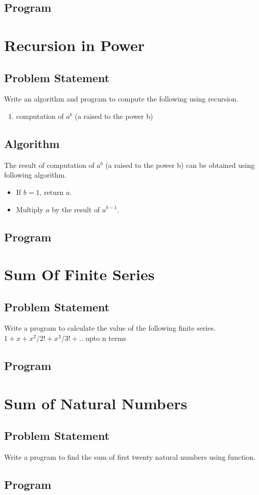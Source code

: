 \documentclass[11pt]{report}
\begin{document}
\section{Program}
        

\chapter{Recursion in Power}
\section{Problem Statement}
Write an algorithm and program to compute the following using recursion.
\begin{enumerate}
  \item computation of $a^b$ (a raised to the power b)
\end{enumerate}
\section{Algorithm}
The result of computation of $a^b$ (a raised to the power b) can be obtained using following algorithm.
\begin{itemize}
\item If $b = 1$, return $a$.
\item Multiply $a$ by the result of $a^{b-1}$.
\end{itemize}
\section{Program}
        
        
\chapter{Sum Of Finite Series}
\section{Problem Statement}
Write a program to calculate the value of the following finite series.
$1+x+x^2/2!+x^3/3!+..$ upto n terms
\section{Program}


\chapter{Sum of Natural Numbers}
\section{Problem Statement}
Write a program to find the sum of first twenty natural numbers using function.
\section{Program}

\end{document}
